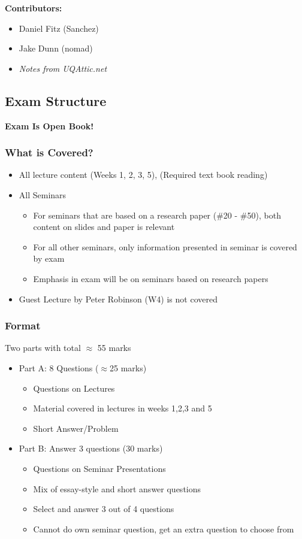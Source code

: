 \documentclass[12pt, a4paper]{report}
\begin{document}
	\tableofcontents
	\vspace{2em}
	\textbf{Contributors:}
	\begin{itemize}
		\item Daniel Fitz (Sanchez)
		\item Jake Dunn (nomad)
		\item \textit{Notes from UQAttic.net}
	\end{itemize}
	\newpage

\begin{multicols*}{2}

\chapter{Exam Structure}
\textbf{Exam Is Open Book!}
\subsection{What is Covered?}
\begin{itemize}
	\item All lecture content (Weeks 1, 2, 3, 5), (Required text book reading)
	\item All Seminars
	\begin{itemize}
		\item For seminars that are based on a research paper (\#20 - \#50), both content on slides and paper is relevant
		\item For all other seminars, only information presented in seminar is covered by exam
		\item Emphasis in exam will be on seminars based on research papers
	\end{itemize}
	\item Guest Lecture by Peter Robinson (W4) is not covered
\end{itemize}
\subsection{Format}
Two parts with total $\approx$ 55 marks
\begin{itemize}
	\item Part A: 8 Questions ($\approx$25 marks)
	\begin{itemize}
		\item Questions on Lectures
		\item Material covered in lectures in weeks 1,2,3 and 5
		\item Short Answer/Problem
	\end{itemize}
	\item Part B: Answer 3 questions (30 marks)
	\begin{itemize}
		\item Questions on Seminar Presentations
		\item Mix of essay-style and short answer questions
		\item Select and answer 3 out of 4 questions
		\item Cannot do own seminar question, get an extra question to choose from
	\end{itemize}
\end{itemize}

\end{multicols*}
\end{document}
